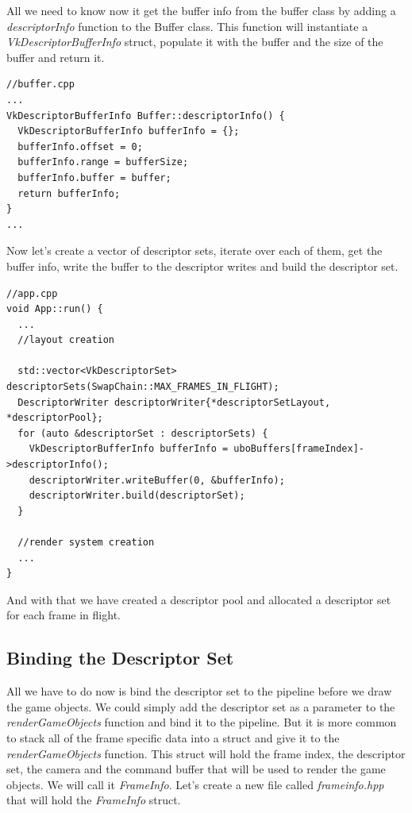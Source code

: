 \documentclass[12pt]{report} \usepackage{preamble}
\begin{document}
All we need to know now it get the buffer info from the buffer class by adding a \textit{descriptorInfo} function to the Buffer class.
This function will instantiate a \textit{VkDescriptorBufferInfo} struct, populate it with the buffer and the size of the buffer and return it.

\begin{lstlisting}[Language=C++]
//buffer.cpp
...
VkDescriptorBufferInfo Buffer::descriptorInfo() {
  VkDescriptorBufferInfo bufferInfo = {};
  bufferInfo.offset = 0;
  bufferInfo.range = bufferSize;
  bufferInfo.buffer = buffer;
  return bufferInfo;
}
...
\end{lstlisting}

Now let's create a vector of descriptor sets, iterate over each of them, get the buffer info,
write the buffer to the descriptor writes and build the descriptor set.

\begin{lstlisting}[Language=C++]
//app.cpp
void App::run() {
  ...
  //layout creation

  std::vector<VkDescriptorSet> descriptorSets(SwapChain::MAX_FRAMES_IN_FLIGHT);
  DescriptorWriter descriptorWriter{*descriptorSetLayout, *descriptorPool};
  for (auto &descriptorSet : descriptorSets) {
    VkDescriptorBufferInfo bufferInfo = uboBuffers[frameIndex]->descriptorInfo();
    descriptorWriter.writeBuffer(0, &bufferInfo);
    descriptorWriter.build(descriptorSet);
  }

  //render system creation
  ...
}
\end{lstlisting}

And with that we have created a descriptor pool and allocated a descriptor set for each frame in flight.

\subsection{Binding the Descriptor Set}

All we have to do now is bind the descriptor set to the pipeline before we draw the game objects.
We could simply add the descriptor set as a parameter to the \textit{renderGameObjects} function and bind it to the pipeline.
But it is more common to stack all of the frame specific data into a struct and give it to the \textit{renderGameObjects} function.
This struct will hold the frame index, the descriptor set, the camera and the command buffer that will be used to render the game objects.
We will call it \textit{FrameInfo}. Let's create a new file called \textit{frame\textunderscore info.hpp} that will hold the \textit{FrameInfo} struct.
\end{document}
